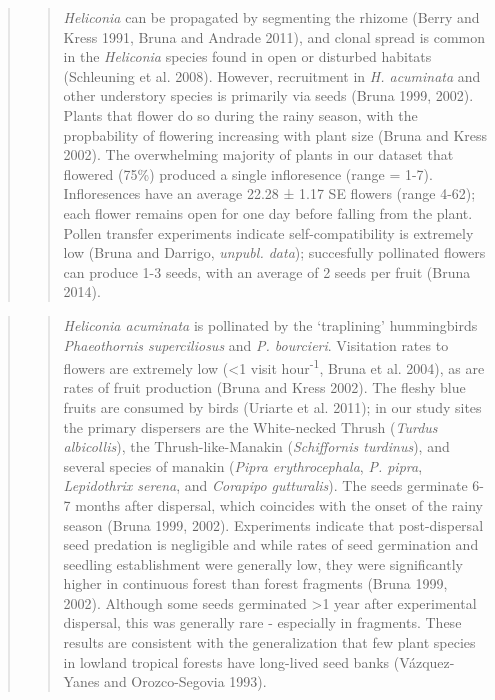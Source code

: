 \documentclass[
  12pt,
  man, donotrepeattitle]{apa6}
\begin{document}
\begin{quote}
\begin{quote}
\emph{Heliconia} can be propagated by segmenting the rhizome (Berry and Kress 1991, Bruna and Andrade 2011), and clonal spread is common in the \emph{Heliconia} species found in open or disturbed habitats (Schleuning et al. 2008). However, recruitment in \emph{H. acuminata} and other understory species is primarily via seeds (Bruna 1999, 2002). Plants that flower do so during the rainy season, with the propbability of flowering increasing with plant size (Bruna and Kress 2002). The overwhelming majority of plants in our dataset that flowered (75\%) produced a single infloresence (range = 1-7). Infloresences have an average 22.28 ± 1.17 SE flowers (range 4-62); each flower remains open for one day before falling from the plant. Pollen transfer experiments indicate self-compatibility is extremely low (Bruna and Darrigo, \emph{unpubl. data}); succesfully pollinated flowers can produce 1-3 seeds, with an average of 2 seeds per fruit (Bruna 2014).
\end{quote}
\end{quote}

\begin{quote}
\begin{quote}
\emph{Heliconia acuminata} is pollinated by the `traplining' hummingbirds \emph{Phaeothornis superciliosus} and \emph{P. bourcieri}. Visitation rates to flowers are extremely low (\textless1 visit hour\textsuperscript{-1}, Bruna et al. 2004), as are rates of fruit production (Bruna and Kress 2002). The fleshy blue fruits are consumed by birds (Uriarte et al. 2011); in our study sites the primary dispersers are the White-necked Thrush (\emph{Turdus albicollis}), the Thrush-like-Manakin (\emph{Schiffornis turdinus}), and several species of manakin (\emph{Pipra erythrocephala}, \emph{P. pipra}, \emph{Lepidothrix serena}, and \emph{Corapipo gutturalis}). The seeds germinate 6-7 months after dispersal, which coincides with the onset of the rainy season (Bruna 1999, 2002). Experiments indicate that post-dispersal seed predation is negligible and while rates of seed germination and seedling establishment were generally low, they were significantly higher in continuous forest than forest fragments (Bruna 1999, 2002). Although some seeds germinated \textgreater1 year after experimental dispersal, this was generally rare - especially in fragments. These results are consistent with the generalization that few plant species in lowland tropical forests have long-lived seed banks (Vázquez-Yanes and Orozco-Segovia 1993).
\end{quote}
\end{quote}
\end{document}
